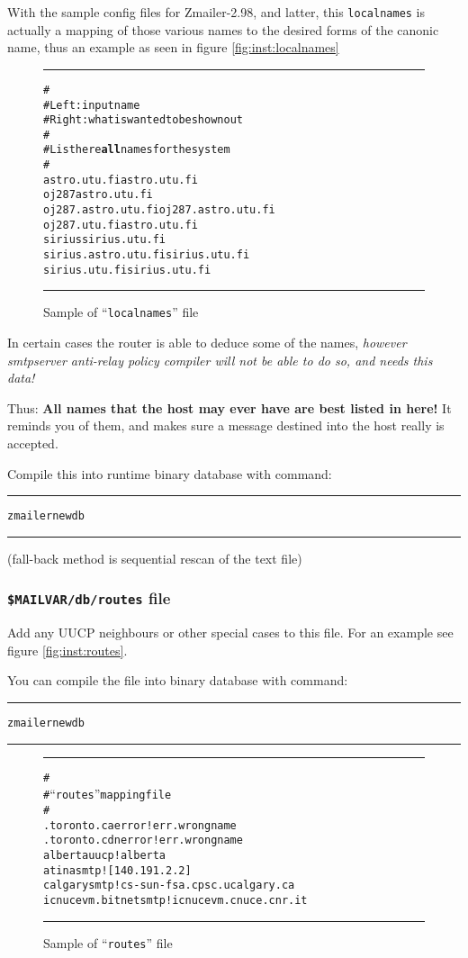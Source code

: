 With the sample config files for Zmailer-2.98, and latter,
this {\tt localnames} is actually a mapping of those various names to
the desired forms of the canonic name, thus an example as seen
in figure \vref{fig:inst:localnames}

\begin{figure*}
\begin{alltt}\hrule\medskip
#
# Left:  input name
# Right: what is wanted to be shown out
#
# List here {\bf all} names for the system
#
astro.utu.fi         astro.utu.fi
oj287                astro.utu.fi
oj287.astro.utu.fi   oj287.astro.utu.fi
oj287.utu.fi         astro.utu.fi
sirius               sirius.utu.fi
sirius.astro.utu.fi  sirius.utu.fi
sirius.utu.fi        sirius.utu.fi
\medskip\hrule\medskip\end{alltt}
\caption{\label{fig:inst:localnames}Sample of ``{\tt localnames}'' file}
\end{figure*}

In certain cases the router is able to deduce some of the names,
{\em however smtpserver anti-relay policy compiler will not be able
 to do so, and needs this data!}

Thus: {\bf All names that the host may ever have are best listed in here!}
It reminds you of them, and makes sure a message destined into the host
really is accepted.

Compile this into runtime binary database with command:
\begin{alltt}\medskip\hrule\medskip
  zmailer newdb
\medskip\hrule\medskip\end{alltt}
(fall-back method is sequential rescan of the text file)

\subsubsection{{\tt \$MAILVAR/db/routes} file}

Add any UUCP neighbours or other special cases to this file.
For an example see figure \vref{fig:inst:routes}.

You can compile the file into binary database with command:
\begin{alltt}\medskip\hrule\medskip
  zmailer newdb
\medskip\hrule\medskip\end{alltt}

\begin{figure*}
\begin{alltt}\hrule\medskip
#
# ``routes'' mapping file
#
.toronto.ca      error!err.wrongname
.toronto.cdn     error!err.wrongname
alberta          uucp!alberta
atina            smtp![140.191.2.2]
calgary          smtp!cs-sun-fsa.cpsc.ucalgary.ca
icnucevm.bitnet  smtp!icnucevm.cnuce.cnr.it
\medskip\hrule\end{alltt}\medskip
\caption{\label{fig:inst:routes}Sample of ``{\tt routes}'' file}
\end{figure*}

